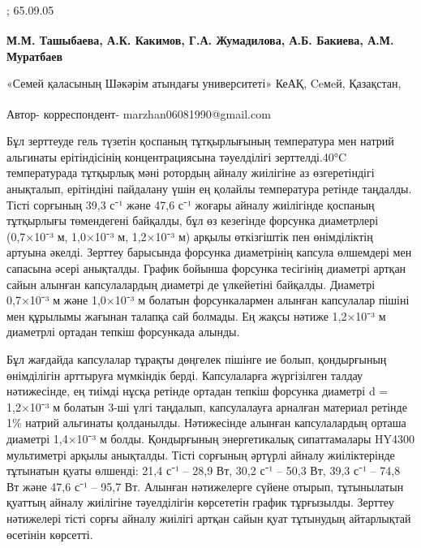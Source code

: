 ; 65.09.05

\begin{articleheader}

{\bfseries
М.М. Ташыбаева\textsuperscript{\envelope },
А.К. Какимов,
Г.А. Жумадилова,
А.Б. Бакиева,
А.М. Муратбаев
}
\end{articleheader}

\begin{affiliation}
«Семей қаласының Шәкәрім атындағы университеті» КеАҚ, Ceмeй, Қазақстан,

\raggedright \textsuperscript{\envelope } Автор- корреспондент-
marzhan06081990@gmail.com
\end{affiliation}

Бұл зерттеуде гель түзетін қоспаның тұтқырлығының температура мен натрий
альгинаты ерітіндісінің концентрациясына тәуелділігі зерттелді.40°C
температурада тұтқырлық мәні ротордың айналу жиілігіне аз өзгеретіндігі
анықталып, ерітіндіні пайдалану үшін ең қолайлы температура ретінде
таңдалды. Тісті сорғының 39,3 с⁻¹ және 47,6 с⁻¹ жоғары айналу жиілігінде
қоспаның тұтқырлығы төмендегені байқалды, бұл өз кезегінде форсунка
диаметрлері (0,7×10⁻³ м, 1,0×10⁻³ м, 1,2×10⁻³ м) арқылы өткізгіштік пен
өнімділіктің артуына әкелді. Зерттеу барысында форсунка диаметрінің
капсула өлшемдері мен сапасына әсері анықталды. График бойынша форсунка
тесігінің диаметрі артқан сайын алынған капсулалардың диаметрі де
үлкейетіні байқалды. Диаметрі 0,7×10⁻³ м және 1,0×10⁻³ м болатын
форсункалармен алынған капсулалар пішіні мен құрылымы жағынан талапқа
сай болмады. Ең жақсы нәтиже 1,2×10⁻³ м диаметрлі ортадан тепкіш
форсункада алынды.

Бұл жағдайда капсулалар тұрақты дөңгелек пішінге ие болып, қондырғының
өнімділігін арттыруға мүмкіндік берді. Капсулаларға жүргізілген талдау
нәтижесінде, ең тиімді нұсқа ретінде ортадан тепкіш форсунка диаметрі d
= 1,2×10⁻³ м болатын 3-ші үлгі таңдалып, капсулалауға арналған материал
ретінде 1\% натрий альгинаты қолданылды. Нәтижесінде алынған
капсулалардың орташа диаметрі 1,4×10⁻³ м болды. Қондырғының
энергетикалық сипаттамалары HY4300 мультиметрі арқылы анықталды. Тісті
сорғының әртүрлі айналу жиіліктерінде тұтынатын қуаты өлшенді: 21,4 с⁻¹
-- 28,9 Вт, 30,2 с⁻¹ -- 50,3 Вт, 39,3 с⁻¹ -- 74,8 Вт және 47,6 с⁻¹ --
95,7 Вт. Алынған нәтижелерге сүйене отырып, тұтынылатын қуаттың айналу
жиілігіне тәуелділігін көрсететін график тұрғызылды. Зерттеу нәтижелері
тісті сорғы айналу жиілігі артқан сайын қуат тұтынудың айтарлықтай
өсетінін көрсетті.

